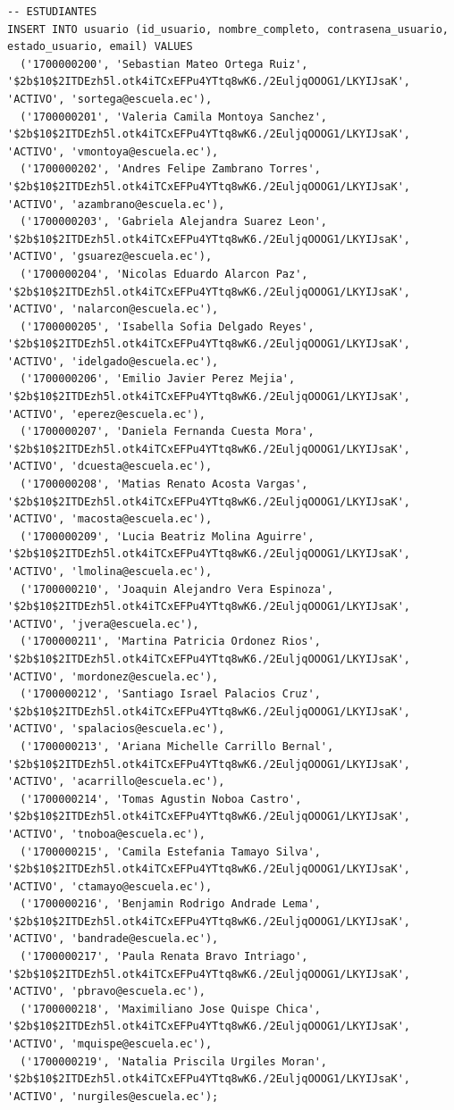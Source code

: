 \documentclass[12pt, a4paper]{article}
\begin{document}
\begin{lstlisting}[style=sql, caption={SEED --- datos de prueba. Contrasena de todos los usuarios: \texttt{Notas2026!}}]
-- ESTUDIANTES
INSERT INTO usuario (id_usuario, nombre_completo, contrasena_usuario, estado_usuario, email) VALUES
  ('1700000200', 'Sebastian Mateo Ortega Ruiz',     '$2b$10$2ITDEzh5l.otk4iTCxEFPu4YTtq8wK6./2EuljqOOOG1/LKYIJsaK', 'ACTIVO', 'sortega@escuela.ec'),
  ('1700000201', 'Valeria Camila Montoya Sanchez',  '$2b$10$2ITDEzh5l.otk4iTCxEFPu4YTtq8wK6./2EuljqOOOG1/LKYIJsaK', 'ACTIVO', 'vmontoya@escuela.ec'),
  ('1700000202', 'Andres Felipe Zambrano Torres',   '$2b$10$2ITDEzh5l.otk4iTCxEFPu4YTtq8wK6./2EuljqOOOG1/LKYIJsaK', 'ACTIVO', 'azambrano@escuela.ec'),
  ('1700000203', 'Gabriela Alejandra Suarez Leon',  '$2b$10$2ITDEzh5l.otk4iTCxEFPu4YTtq8wK6./2EuljqOOOG1/LKYIJsaK', 'ACTIVO', 'gsuarez@escuela.ec'),
  ('1700000204', 'Nicolas Eduardo Alarcon Paz',     '$2b$10$2ITDEzh5l.otk4iTCxEFPu4YTtq8wK6./2EuljqOOOG1/LKYIJsaK', 'ACTIVO', 'nalarcon@escuela.ec'),
  ('1700000205', 'Isabella Sofia Delgado Reyes',    '$2b$10$2ITDEzh5l.otk4iTCxEFPu4YTtq8wK6./2EuljqOOOG1/LKYIJsaK', 'ACTIVO', 'idelgado@escuela.ec'),
  ('1700000206', 'Emilio Javier Perez Mejia',       '$2b$10$2ITDEzh5l.otk4iTCxEFPu4YTtq8wK6./2EuljqOOOG1/LKYIJsaK', 'ACTIVO', 'eperez@escuela.ec'),
  ('1700000207', 'Daniela Fernanda Cuesta Mora',    '$2b$10$2ITDEzh5l.otk4iTCxEFPu4YTtq8wK6./2EuljqOOOG1/LKYIJsaK', 'ACTIVO', 'dcuesta@escuela.ec'),
  ('1700000208', 'Matias Renato Acosta Vargas',     '$2b$10$2ITDEzh5l.otk4iTCxEFPu4YTtq8wK6./2EuljqOOOG1/LKYIJsaK', 'ACTIVO', 'macosta@escuela.ec'),
  ('1700000209', 'Lucia Beatriz Molina Aguirre',    '$2b$10$2ITDEzh5l.otk4iTCxEFPu4YTtq8wK6./2EuljqOOOG1/LKYIJsaK', 'ACTIVO', 'lmolina@escuela.ec'),
  ('1700000210', 'Joaquin Alejandro Vera Espinoza', '$2b$10$2ITDEzh5l.otk4iTCxEFPu4YTtq8wK6./2EuljqOOOG1/LKYIJsaK', 'ACTIVO', 'jvera@escuela.ec'),
  ('1700000211', 'Martina Patricia Ordonez Rios',   '$2b$10$2ITDEzh5l.otk4iTCxEFPu4YTtq8wK6./2EuljqOOOG1/LKYIJsaK', 'ACTIVO', 'mordonez@escuela.ec'),
  ('1700000212', 'Santiago Israel Palacios Cruz',   '$2b$10$2ITDEzh5l.otk4iTCxEFPu4YTtq8wK6./2EuljqOOOG1/LKYIJsaK', 'ACTIVO', 'spalacios@escuela.ec'),
  ('1700000213', 'Ariana Michelle Carrillo Bernal', '$2b$10$2ITDEzh5l.otk4iTCxEFPu4YTtq8wK6./2EuljqOOOG1/LKYIJsaK', 'ACTIVO', 'acarrillo@escuela.ec'),
  ('1700000214', 'Tomas Agustin Noboa Castro',      '$2b$10$2ITDEzh5l.otk4iTCxEFPu4YTtq8wK6./2EuljqOOOG1/LKYIJsaK', 'ACTIVO', 'tnoboa@escuela.ec'),
  ('1700000215', 'Camila Estefania Tamayo Silva',   '$2b$10$2ITDEzh5l.otk4iTCxEFPu4YTtq8wK6./2EuljqOOOG1/LKYIJsaK', 'ACTIVO', 'ctamayo@escuela.ec'),
  ('1700000216', 'Benjamin Rodrigo Andrade Lema',   '$2b$10$2ITDEzh5l.otk4iTCxEFPu4YTtq8wK6./2EuljqOOOG1/LKYIJsaK', 'ACTIVO', 'bandrade@escuela.ec'),
  ('1700000217', 'Paula Renata Bravo Intriago',     '$2b$10$2ITDEzh5l.otk4iTCxEFPu4YTtq8wK6./2EuljqOOOG1/LKYIJsaK', 'ACTIVO', 'pbravo@escuela.ec'),
  ('1700000218', 'Maximiliano Jose Quispe Chica',   '$2b$10$2ITDEzh5l.otk4iTCxEFPu4YTtq8wK6./2EuljqOOOG1/LKYIJsaK', 'ACTIVO', 'mquispe@escuela.ec'),
  ('1700000219', 'Natalia Priscila Urgiles Moran',  '$2b$10$2ITDEzh5l.otk4iTCxEFPu4YTtq8wK6./2EuljqOOOG1/LKYIJsaK', 'ACTIVO', 'nurgiles@escuela.ec');


\end{lstlisting}
\end{document}
